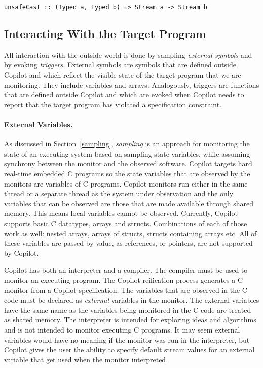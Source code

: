 \begin{lstlisting}[language = Copilot, frame = single]
unsafeCast :: (Typed a, Typed b) => Stream a -> Stream b
\end{lstlisting}

\subsection{Interacting With the Target Program}
\label{subsec:interacting}

All interaction with the outside world is done by sampling \emph{external
  symbols} and by evoking \emph{triggers}.  External symbols are symbols that
are defined outside Copilot and which reflect the visible state of the target
program that we are monitoring.  They include variables and arrays.
Analogously, triggers are functions that are defined outside Copilot and which
are evoked when Copilot needs to report that the target program has violated a
specification constraint.

\paragraph{External Variables.}


As discussed in Section~\ref{sampling}, \emph{sampling} is an approach
for monitoring the state of an executing system based on sampling
state-variables, while assuming synchrony between the monitor and the
observed software. Copilot targets hard real-time embedded C programs
so the state variables that are observed by the monitors are variables
of C programs. Copilot monitors run either in the same thread or a
separate thread as the system under observation and the only variables
that can be observed are those that are made available through shared
memory. This means local variables cannot be observed. Currently,
Copilot supports basic C datatypes, arrays and structs. Combinations of each of
those work as well: nested arrays, arrays of structs, structs containing arrays
etc. All of these variables are passed by value, as references, or pointers,
are not supported by Copilot.


Copilot has both an interpreter and a compiler. The compiler must be
used to monitor an executing program. The Copilot reification process
generates a C monitor from a Copilot specification. The variables that
are observed in the C code must be declared as \emph{external}
variables in the monitor. The external variables have the same name as
the variables being monitored in the C code are treated as shared
memory. The interpreter is intended for exploring ideas and algorithms
and is not intended to monitor executing  C
programs. It may seem external variables would have no meaning if the
monitor was run in the interpreter, but Copilot gives the user the
ability to specify default stream values for an external variable that
get used when the monitor interpreted.

